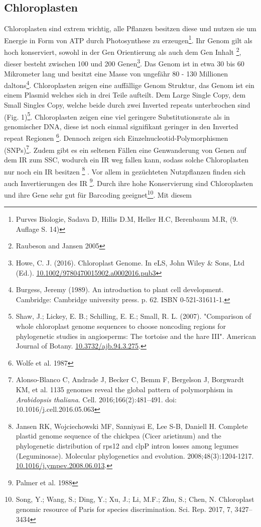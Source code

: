 \documentclass{scrartcl}
\begin{document}
\subsection{Chloroplasten}
\label{sec-2-1}
Chloroplasten sind extrem wichtig, alle Pflanzen besitzen diese und nutzen sie um Energie in Form von ATP durch Photosynthese zu erzeugen\footnote{Purves Biologie, Sadava D, Hillis D.M, Heller H.C, Berenbaum M.R, (9. Auflage S. 14)}.
Ihr Genom gilt als hoch konserviert, sowohl in der Gen Orientierung als auch dem Gen Inhalt \footnote{Raubeson and Jansen 2005}, dieser besteht zwischen 100 und 200 Genen\footnote{Howe, C. J. (2016). Chloroplast Genome. In eLS, John Wiley \& Sons, Ltd (Ed.). \url{10.1002/9780470015902.a0002016.pub3}}. 
Das Genom ist in etwa 30 bis 60 Mikrometer lang und besitzt eine Masse von ungefähr 80 - 130 Millionen daltons\footnote{Burgess, Jeremy (1989). An introduction to plant cell development. Cambridge: Cambridge university press. p. 62. ISBN 0-521-31611-1.}.
Chloroplasten zeigen
eine auffällige Genom Struktur, das Genom ist ein einem Plasmid welches sich in drei Teile aufteilt. Dem Large Single Copy, dem 
Small Singles Copy, welche beide durch zwei Inverted repeats unterbrochen sind (Fig. 1)\footnote{Shaw, J.; Lickey, E. B.; Schilling, E. E.; Small, R. L. (2007). "Comparison of whole chloroplast genome sequences to choose noncoding regions for phylogenetic studies in angiosperms: The tortoise and the hare III". American Journal of Botany. \url{10.3732/ajb.94.3.275}.}. Chloroplasten zeigen eine viel geringere Substitutionsrate
als in genomischer DNA, diese ist noch einmal signifikant geringer in den Inverted repeat Regionen \footnote{Wolfe et al. 1987}. Dennoch zeigen sich
Einzelnucleotid-Polymorphismen (SNPs)\footnote{Alonso-Blanco C, Andrade J, Becker C, Bemm F, Bergelson J, Borgwardt KM, et al. 1135 genomes reveal the global pattern of polymorphism in \emph{Arabidopsis thaliana}. Cell. 2016;166(2):481–491. doi: 10.1016/j.cell.2016.05.063}. Zudem gibt es ein seltenen Fällen eine Genwanderung von Genen auf dem IR zum SSC, wodurch ein IR weg
fallen kann, sodass solche Chloroplasten nur noch ein IR besitzen \footnote{Jansen RK, Wojciechowski MF, Sanniyasi E, Lee S-B, Daniell H. Complete plastid genome sequence of the chickpea (Cicer arietinum) and the phylogenetic distribution of rps12 and clpP intron losses among legumes (Leguminosae). Molecular phylogenetics and evolution. 2008;48(3):1204-1217. \url{10.1016/j.ympev.2008.06.013}.} . Vor allem in gezüchteten Nutzpflanzen finden sich auch 
Invertierungen des IR \footnote{Palmer et al. 1988}. Durch ihre hohe Konservierung sind Chloroplasten und ihre Gene sehr gut für Barcoding geeignet\footnote{Song, Y.; Wang, S.; Ding, Y.; Xu, J.; Li, M.F.; Zhu, S.; Chen, N. Chloroplast genomic resource of Paris for species discrimination. Sci. Rep. 2017, 7, 3427–3434}. Mit diesem
\end{document}
